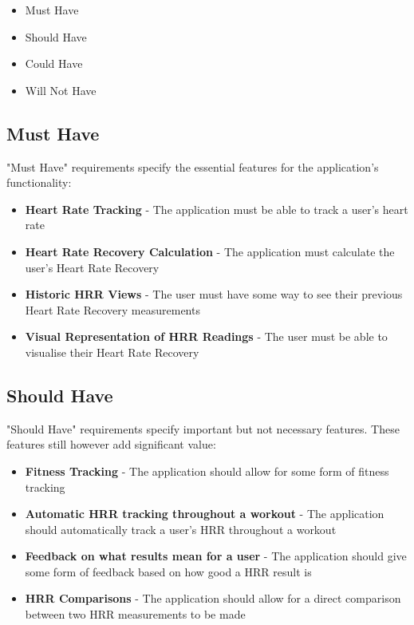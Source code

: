 \documentclass{l4proj}
\begin{document}
\begin{itemize}
    \item Must Have 
    \item Should Have
    \item Could Have
    \item Will Not Have
\end{itemize}

\subsection{Must Have}
\label{sec:musthave}

"Must Have" requirements specify the essential features for the application's functionality:

\begin{itemize}
    \item \textbf{Heart Rate Tracking} - The application must be able to track a user's heart rate
    \item \textbf{Heart Rate Recovery Calculation} - The application must calculate the user's Heart Rate Recovery
    \item \textbf{Historic HRR Views} - The user must have some way to see their previous Heart Rate Recovery measurements
    \item \textbf{Visual Representation of HRR Readings} - The user must be able to visualise their Heart Rate Recovery
\end{itemize}

\subsection{Should Have}
\label{sec:shouldhave}

"Should Have" requirements specify important but not necessary features. These features still however add significant value:

\begin{itemize}
    \item \textbf{Fitness Tracking} - The application should allow for some form of fitness tracking
    \item \textbf{Automatic HRR tracking throughout a workout} - The application should automatically track a user's HRR throughout a workout
    \item \textbf{Feedback on what results mean for a user} - The application should give some form of feedback based on how good a HRR result is
    \item \textbf{HRR Comparisons} - The application should allow for a direct comparison between two HRR measurements to be made 
    
\end{itemize}
\end{document}

